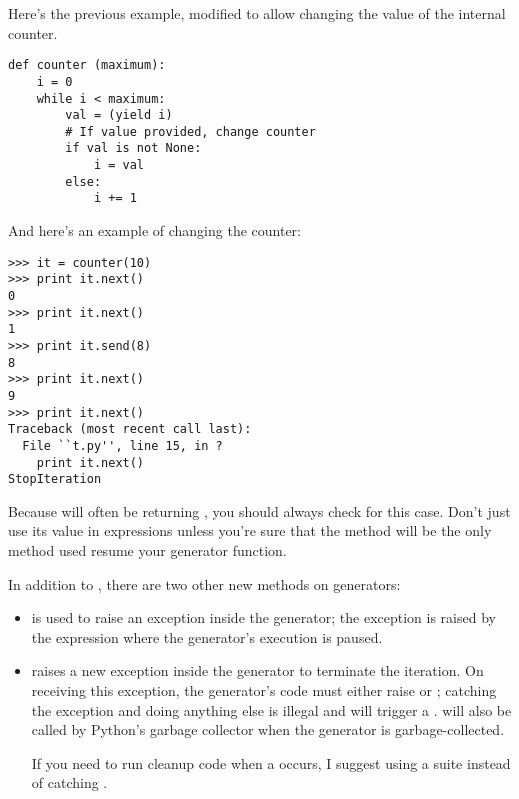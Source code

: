 \documentclass{howto}
\begin{document}
Here's the previous example, modified to allow changing the value of
the internal counter.

\begin{verbatim}
def counter (maximum):
    i = 0
    while i < maximum:
        val = (yield i)
        # If value provided, change counter
        if val is not None:
            i = val
        else:
            i += 1
\end{verbatim}

And here's an example of changing the counter:

\begin{verbatim}
>>> it = counter(10)
>>> print it.next()
0
>>> print it.next()
1
>>> print it.send(8)
8
>>> print it.next()
9
>>> print it.next()
Traceback (most recent call last):
  File ``t.py'', line 15, in ?
    print it.next()
StopIteration
\end{verbatim}

Because  will often be returning , you
should always check for this case.  Don't just use its value in
expressions unless you're sure that the  method
will be the only method used resume your generator function.

In addition to , there are two other new methods on
generators:

\begin{itemize}

  \item {} is used to raise an exception inside the
  generator; the exception is raised by the  expression
  where the generator's execution is paused.

  \item {} raises a new 
  exception inside the generator to terminate the iteration.  
  On receiving this
  exception, the generator's code must either raise
   or ; catching the 
  exception and doing anything else is illegal and will trigger
  a .   will also be called by 
  Python's garbage collector when the generator is garbage-collected.

  If you need to run cleanup code when a  occurs,
  I suggest using a  suite instead of 
  catching .

\end{itemize}
\end{document}
